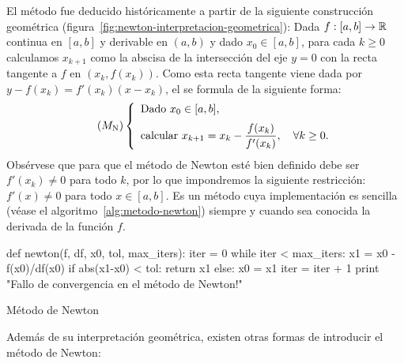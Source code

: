 El método fue deducido históricamente a partir de la siguiente
construcción geométrica
(figura~\ref{fig:newton-interpretacion-geometrica}): Dada
$f:[a,b]\to\operatorname{{\mathbb R}}$ continua en $[a,b]$ y derivable en $(a,b)$ y dado
$x_0\in [a,b]$, para cada $k\ge 0$ calculamos $x_{k+1}$ como la
abscisa de la intersección del eje $y=0$ con la recta tangente a $f$
en $(x_k,f(x_k))$. Como esta recta tangente viene dada por
$y-f(x_k) = f'(x_k)(x-x_k)$, el  se formula de la siguiente forma:
\begin{equation}
  \tag{$M_{\text{N}}$}
  \left\{
    \begin{array}{l}
      \text{Dado } x_0\in [a,b], \\ \noalign{\medskip}
      \text{calcular } x_{k+1} = x_k - \dfrac{f(x_k)}{f'(x_k)} , \quad \forall k\ge 0.
    \end{array}
  \right.
  \label{eq:MetNewton}
\end{equation}
Obsérvese que para que el método de Newton esté bien definido debe ser
$f'(x_k)\neq 0$ para todo $k$, por lo que impondremos la siguiente
restricción: $f'(x)\neq 0$ para todo $x\in [a,b]$. Es un método cuya
implementación es sencilla (véase el
algoritmo~\ref{alg:metodo-newton}) siempre y cuando sea conocida la
derivada de la función $f$.
\begin{algorithm}  \begin{python}
def newton(f, df, x0, tol, max_iters):
    iter = 0
    while iter < max_iters:
        x1 = x0 - f(x0)/df(x0)
        if abs(x1-x0) < tol: 
            return x1
        else:
            x0 = x1
            iter = iter + 1        
    print "Fallo de convergencia en el método de Newton!"
\end{python}
\caption{Método de Newton}
\label{alg:metodo-newton}
\end{algorithm}
Además de su interpretación geométrica, existen otras formas de
introducir el método de Newton:

